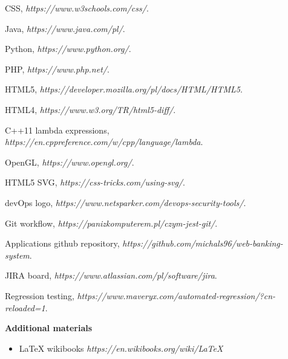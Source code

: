 \documentclass[a4paper,12pt]{book}
\begin{document}
{\begin{thebibliography}{9}
  CSS,
  \emph{https://www.w3schools.com/css/}.
 
  Java,
  \emph{https://www.java.com/pl/}.
  
  Python,
  \emph{https://www.python.org/}.
  
  PHP,
  \emph{https://www.php.net/}.
  
  HTML5,
  \emph{https://developer.mozilla.org/pl/docs/HTML/HTML5}.
  
  HTML4,
  \emph{https://www.w3.org/TR/html5-diff/}.
  
  C++11 lambda expressions,
  \emph{https://en.cppreference.com/w/cpp/language/lambda}.
  
  OpenGL,
  \emph{https://www.opengl.org/}.
  
  HTML5 SVG,
  \emph{https://css-tricks.com/using-svg/}.

  devOps logo,
  \emph{https://www.netsparker.com/devops-security-tools/}.
  
  Git workflow,
  \emph{https://panizkomputerem.pl/czym-jest-git/}.
  
  Applications github repository,
  \emph{https://github.com/michals96/web-banking-system}.   

  JIRA board,
  \emph{https://www.atlassian.com/pl/software/jira}.   
  
  Regression testing,
  \emph{https://www.maveryx.com/automated-regression/?cn-reloaded=1}. 
\end{thebibliography}

\textbf{Additional materials} \begin{itemize}
	\item LaTeX wikibooks \newline \textit{https://en.wikibooks.org/wiki/LaTeX}

\end{itemize}
}
\newpage

\linespread{1.3}
\selectfont
\end{document}
